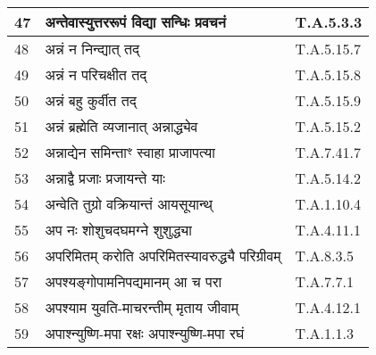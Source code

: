 \documentclass[17pt]{extarticle}
\begin{document}
\begin{longtable}{||p{0.4in}||p{4.9in}||p{0.9in}||}
    \hline
        
    47 & अन्तेवास्युत्तररूपं विद्या सन्धिः प्रवचनं & T.A.5.3.3       \\
    
    \hline
        
    48 & अन्नं न निन्द्यात् तद् & T.A.5.15.7       \\
    
    \hline
        
    49 & अन्नं न परिचक्षीत तद् & T.A.5.15.8       \\
    
    \hline
        
    50 & अन्नं बहु कुर्वीत तद् & T.A.5.15.9       \\
    
    \hline
        
    51 & अन्नं ब्रह्मेति व्यजानात् अन्नाद्ध्येव & T.A.5.15.2       \\
    
    \hline
        
    52 & अन्नाद्येन समिन्ताꣳ स्वाहा प्राजापत्या & T.A.7.41.7       \\
    
    \hline
        
    53 & अन्नाद्वै प्रजाः प्रजायन्ते याः & T.A.5.14.2       \\
    
    \hline
        
    54 & अन्वेति तुग्रो वक्रियान्तं आयसूयान्थ् & T.A.1.10.4       \\
    
    \hline
        
    55 & अप नः शोशुचदघमग्ने शुशुद्ध्या & T.A.4.11.1       \\
    
    \hline
        
    56 & अपरिमितम् करोति अपरिमितस्यावरुद्ध्यै परिग्रीवम् & T.A.8.3.5       \\
    
    \hline
        
    57 & अपश्यङ्गोपामनिपद्यमानम् आ च परा & T.A.7.7.1       \\
    
    \hline
        
    58 & अपश्याम युवति{-}माचरन्तीम् मृताय जीवाम् & T.A.4.12.1       \\
    
    \hline
        
    59 & अपाश्न्युष्णि{-}मपा रक्षः अपाश्न्युष्णि{-}मपा रघं & T.A.1.1.3       \\
    

\end{longtable}
\end{document}
